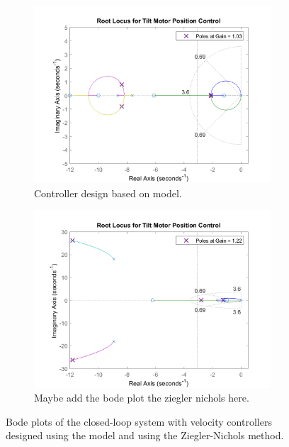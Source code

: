\documentclass[../../main.tex]{subfiles}
\begin{document}
\begin{figure}[h]
\begin{subfigure}{0.48\textwidth}
    \includegraphics[width = 0.97\textwidth]{Sections/System_Design/Images/RL_cascadePP.png}
    \caption{Controller design based on model.}
    \label{fig:RL_cascade_PP}
\end{subfigure}\quad
\begin{subfigure}{0.48\textwidth}
    \includegraphics[width = 0.97\textwidth]{Sections/System_Design/Images/RL_cascadeNZ.png}
    \caption{Maybe add the bode plot the ziegler nichols here.}
    \label{fig:RL_cascade_NZ}
\end{subfigure}
\caption{Bode plots of the closed-loop system with velocity controllers designed using the model and using the Ziegler-Nichols method.}
\label{fig:RL_cascade}
\end{figure}
\end{document}
